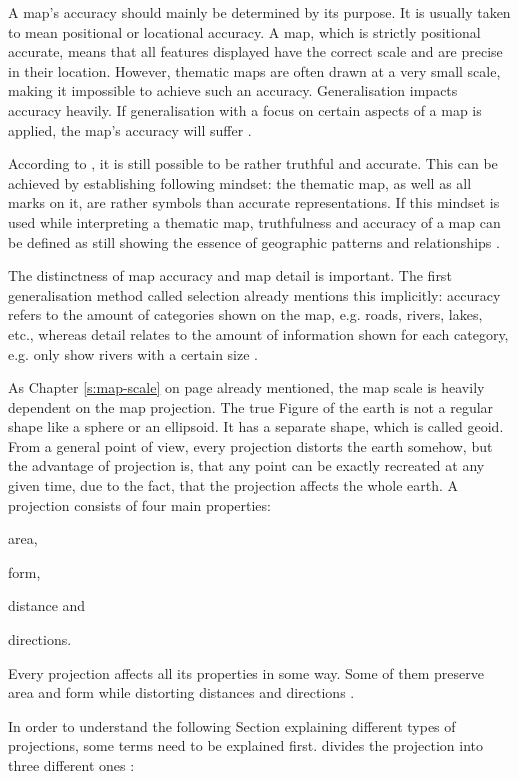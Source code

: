 A map's accuracy should mainly be determined by its purpose. It is usually taken to mean positional or locational accuracy. A map, which is strictly positional accurate, means that all features displayed have the correct scale and are precise in their location. However, thematic maps are often drawn at a very small scale, making it impossible to achieve such an accuracy. Generalisation impacts accuracy heavily. If generalisation with a focus on certain aspects of a map is applied, the map's accuracy will suffer .

According to \citeauthor{Tyner2010}, it is still possible to be rather truthful and accurate. This can be achieved by establishing following mindset: the thematic map, as well as all marks on it, are rather symbols than accurate representations. If this mindset is used while interpreting a thematic map, truthfulness and accuracy of a map can be defined as still showing the essence of geographic patterns and relationships .

The distinctness of map accuracy and map detail is important. The first generalisation method called selection already mentions this implicitly: accuracy refers to the amount of categories shown on the map, e.g. roads, rivers, lakes, etc., whereas detail relates to the amount of information shown for each category, e.g. only show rivers with a certain size .

As Chapter \ref{s:map-scale} on page \pageref{s:map-scale} already mentioned, the map scale is heavily dependent on the map projection. The true Figure of the earth is not a regular shape like a sphere or an ellipsoid. It has a separate shape, which is called geoid.
From a general point of view, every projection distorts the earth somehow, but the advantage of projection is, that any point can be exactly recreated at any given time, due to the fact, that the projection affects the whole earth.
A projection consists of four main properties:
\begin{enumerate*}[label={(\arabic*)}]
\item area,
\item form,
\item distance and
\item directions.
\end{enumerate*}
Every projection affects all its properties in some way. Some of them preserve area and form while distorting distances and directions .

In order to understand the following Section explaining different types of projections, some terms need to be explained first. \citeauthor{Snyder1987} divides the projection into three different ones :


